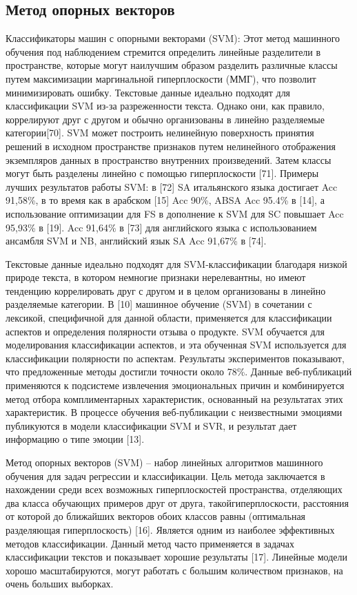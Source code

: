 \subsection{Метод опорных векторов}

Классификаторы машин с опорными векторами (SVM): Этот метод машинного обучения
под наблюдением стремится определить линейные разделители в пространстве,
которые могут наилучшим образом разделить различные классы путем максимизации
маргинальной гиперплоскости (ММГ), что позволит минимизировать ошибку. Текстовые
данные идеально подходят для классификации SVM из-за разреженности текста.
Однако они, как правило, коррелируют друг с другом и обычно организованы в
линейно разделяемые категории[70]. SVM может построить нелинейную поверхность
принятия решений в исходном пространстве признаков путем нелинейного отображения
экземпляров данных в пространство внутренних произведений. Затем классы могут
быть разделены линейно с помощью гиперплоскости [71].  Примеры лучших
результатов работы SVM: в [72] SA итальянского языка достигает Acc 91,58\%, в то
время как в арабском [15] Acc 90\%, ABSA Acc 95.4\% в [14], а использование
оптимизации для FS в дополнение к SVM для SC повышает Acc 95,93\% в [19]. Acc
91,64\% в [73] для английского языка с использованием ансамбля SVM и NB,
английский язык SA Acc 91,67\% в [74]. \cite{article2}

Текстовые данные идеально подходят для SVM-классификации благодаря низкой
природе текста, в котором немногие признаки нерелевантны, но имеют тенденцию
коррелировать друг с другом и в целом организованы в линейно разделяемые
категории.
В [10] машинное обучение (SVM) в сочетании с лексикой, специфичной для данной
области, применяется для классификации аспектов и определения полярности отзыва
о продукте. SVM обучается для моделирования классификации аспектов, и эта
обученная SVM используется для классификации полярности по аспектам. Результаты
экспериментов показывают, что предложенные методы достигли точности около 78\%.
Данные веб-публикаций применяются к подсистеме извлечения эмоциональных причин и
комбинируется метод отбора комплиментарных характеристик, основанный на
результатах этих характеристик. В процессе обучения веб-публикации с
неизвестными эмоциями публикуются в модели классификации SVM и SVR, и результат
дает информацию о типе эмоции [13]. \cite{article4}

Метод опорных векторов (SVM) – набор линейных алгоритмов машинного обучения для
задач регрессии и классификации. Цель метода заключается в нахождении среди всех
возможных гиперплоскостей пространства, отделяющих два класса обучающих примеров
друг от друга, такойгиперплоскости, расстояния от которой до ближайших векторов
обоих классов равны (оптимальная разделяющая гиперплоскость) [16]. Является
одним из наиболее эффективных методов классификации. Данный метод часто
применяется в задачах классификации текстов и показывает хорошие результаты
[17]. Линейные модели хорошо масштабируются, могут работать с большим
количеством признаков, на очень больших выборках. \cite{article9}

